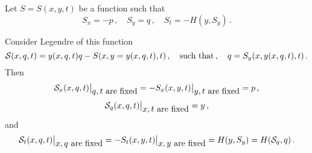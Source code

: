 

\baselineskip=14pt
\def\vare {\varepsilon}
\def\A {{\bf A}}
\def\t {\tilde}
\def\a {\alpha}
\def\K {{\bf K}}
\def\N {{\bf N}}
\def\V {{\cal V}}
\def\s {{\sigma}}
\def\S {{\Sigma}}
\def\s {{\sigma}}
\def\p{\partial}
\def\vare{{\varepsilon}}
\def\Q {{\bf Q}}
\def\D {{\cal D}}
\def\G {{\Gamma}}
\def\C {{\bf C}}
\def\M {{\cal M}}
\def\Z {{\bf Z}}
\def\U  {{\cal U}}
\def\H {{\cal H}}
\def\R  {{\bf R}}
\def\S  {{\bf S}}
\def\E  {{\bf E}}
\def\l {\lambda}
\def\ll {{\bf l}}
\def\degree {{\bf {\rm degree}\,\,}}
\def \finish {${\,\,\vrule height1mm depth2mm width 8pt}$}
\def \m {\medskip}
\def\p {\partial}
\def\r {{\bf r}}
\def\pt {{\bf p}}
\def\v {{\bf v}}
\def\n {{\bf n}}
\def\t {{\bf t}}
\def\b {{\bf b}}
\def\c {{\bf c }}
\def\e{{\bf e}}
\def\ac {{\bf a}}
\def \X   {{\bf X}}
\def \Y   {{\bf Y}}
\def \x   {{\bf x}}
\def \y   {{\bf y}}
\def \G{{\cal G}}
\def\w {{\omega}}
\def \Tr  {{\rm Tr\,}}
\def\V {{\cal V}}
\def\S {{\cal S}}

   Let $S=S(x,y,t)$  be a function such that
               $$
          S_x=-p\,,\quad S_y=q\,,\quad S_t=-H(y,S_y)\,.
                     $$

Consider Legendre of this function
              $$
\S(x,q,t)=y(x,q,t)q-S(x,y=y(x,q,t),t)\,,\quad
\hbox {such that}\,,\quad q=S_y(x,y(x,q,t),t)\,.
              $$
Then
          $$
  \S_x(x,q,t)\big\vert_{\hbox {$q,t$ are fixed}}=
  -S_x(x,y,t)\big\vert_{\hbox {$y,t$ are fixed}}=p\,,
          $$
          $$
  \S_q(x,q,t)\big\vert_{\hbox {$x,t$ are fixed}}=
             y\,,
          $$
and
       $$
\S_t(x,q,t)\big\vert_{\hbox {$x,q$ are fixed}}=
-S_t(x,y,t)\big\vert_{\hbox {$x,y$ are fixed}}=H(y,S_y)=H(\S_q,q)\,.
       $$


\bye
